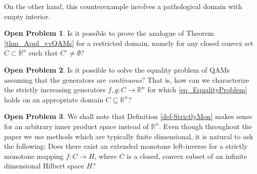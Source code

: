 \documentclass[12pt]{amsart}
\theoremstyle{remark}
\theoremstyle{definition}
\newtheorem{opprob}{Open Problem}
\newcommand{\Rn}{\mathbb{R}^n}
\newcommand{\map}{\longrightarrow}
\begin{document}
On the other hand, this counterexample involves a 
pathological domain with empty interior. 

\begin{opprob}
Is it possible to prove the analogue of 
Theorem \ref{thm_Appl_vvQAMs} for a restricted domain, 
namely for any closed convex set $ C \subset \Rn $ 
such that $ C^{\circ} \neq \emptyset $?  
\end{opprob}

\begin{opprob} 
Is it possible to solve the equality problem of 
QAMs assuming that the generators are {\em continuous}? 
That is, how can we 
characterize the strictly increasing generators 
$ f, g : C \map \Rn $ for which \eqref{eq_EqualityProblem} 
holds on an appropriate domain $ C \subseteq \Rn $? 
\end{opprob}

\begin{opprob}
We shall note that Definition \ref{def-StrictlyMon} 
makes sense for an 
arbitrary inner product space instead of $ \Rn $. Even though 
throughout the paper we use methods which are typically 
finite dimensional, it is natural to ask the following: 
Does there exist an extended monotone 
left-inverse for a strictly monotone mapping 
$ f : C \map H $, where $ C $ is a closed, convex subset 
of an infinite dimensional Hilbert space $ H $? 
\end{opprob}


\end{document}
